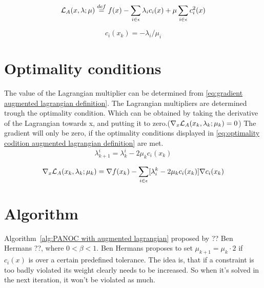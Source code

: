 	\begin{equation}
		\mathcal{L}_A(x,\lambda;\mu) \overset{def}{=} f(x) - \sum_{i \in \epsilon}\lambda_ic_i(x) + \mu \sum_{i \in \epsilon}c_i^2(x)
		\label{eq:augmented lagrangian definition}
	\end{equation}
			
	\begin{equation}
		c_i(x_k) = -\lambda_i/\mu_i
		\label{eq:perturbed feasibility conditions}
	\end{equation}
	

\section{Optimality conditions}
	The value of the Lagrangian multiplier can be determined from \eqref{eq:gradient augmented lagrangian definition}. The Lagrangian multipliers are determined trough the optimality condition. Which can be obtained by taking the derivative of the Lagrangian towards x, and putting it to zero.($\nabla_x \mathcal{L}_A(x_k,\lambda_k;\mu_k) = 0$) The gradient will only be zero, if the optimality conditions displayed in \eqref{eq:optimality codition augmented lagrangian definition} are met.
	\begin{equation}
		\lambda_{k+1}^{i} = \lambda_{k}^{i} - 2\mu_k c_i(x_k)
		\label{eq:optimality codition augmented lagrangian definition}
	\end{equation}

	\begin{equation}
		\nabla_x \mathcal{L}_A(x_k,\lambda_k;\mu_k) = \nabla f(x_k) - \sum_{i \in \epsilon} [\lambda_i^k - 2\mu_k c_i(x_k)] \nabla c_i(x_k)
		\label{eq:gradient augmented lagrangian definition}
	\end{equation}	
	
	
	
\section{Algorithm}
	Algorithm~\ref{alg:PANOC with augmented lagrangian} proposed by ?? Ben Hermans ??, where $0<\beta<1$. Ben Hermans proposes to set $\mu_{k+1}=\mu_k \cdot 2$ if $c_i(x)$ is over a certain predefined tolerance. The idea is, that if a constraint is too badly violated its weight clearly needs to be increased. So when it's solved in the next iteration, it won't be violated as much.
	
